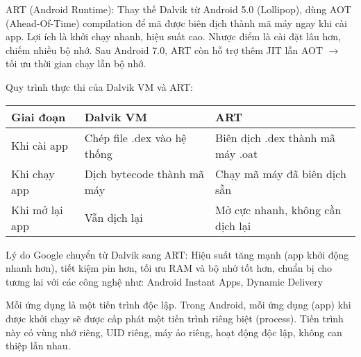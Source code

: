 \begin{flushleft}
    \hspace*{0.8cm}ART (Android Runtime): Thay thế Dalvik từ Android 5.0 (Lollipop), dùng AOT (Ahead-Of-Time) compilation để mã được biên dịch thành mã máy ngay khi cài app.
    Lợi ích là khởi chạy nhanh, hiệu suất cao.
    Nhược điểm là cài đặt lâu hơn, chiếm nhiều bộ nhớ.
    Sau Android 7.0, ART còn hỗ trợ thêm JIT lẫn AOT $\rightarrow$ tối ưu thời gian chạy lẫn bộ nhớ.   
\end{flushleft}

\begin{flushleft}
    \hspace*{0.8cm}Quy trình thực thi của Dalvik VM và ART:
    \begin{center}
        \renewcommand{\arraystretch}{1.3}
        \begin{tabular}{|p{4cm}|p{5cm}|p{5cm}|}
        \hline
        \textbf{Giai đoạn} & \textbf{Dalvik VM} &  \textbf{ART}\\
        \hline
        Khi cài app	 & Chép file .dex vào hệ thống & Biên dịch .dex thành mã máy .oat\\
        \hline
        Khi chạy app & Dịch bytecode thành mã máy & Chạy mã máy đã biên dịch sẵn\\
        \hline
        Khi mở lại app	 & Vẫn dịch lại	& Mở cực nhanh, không cần dịch lại\\
        \hline
        \end{tabular}
        \end{center}  
    \hspace*{0.8cm} Lý do Google chuyển từ Dalvik sang ART: Hiệu suất tăng mạnh (app khởi động nhanh hơn), tiết kiệm pin hơn, tối ưu RAM và bộ nhớ tốt hơn, chuẩn bị cho tương lai với các công nghệ như: Android Instant Apps, Dynamic Delivery
\end{flushleft}

\renewcommand{\labelitemi}{--}    
    \begin{flushleft}
        \hspace*{0.8cm}Mỗi ứng dụng là một tiến trình độc lập. Trong Android, mỗi ứng dụng (app) khi được khởi chạy sẽ được cấp phát một tiến trình riêng biệt (process). Tiến trình này có vùng nhớ riêng, UID riêng, máy ảo riêng, hoạt động độc lập, không can thiệp lẫn nhau.
    \end{flushleft}

